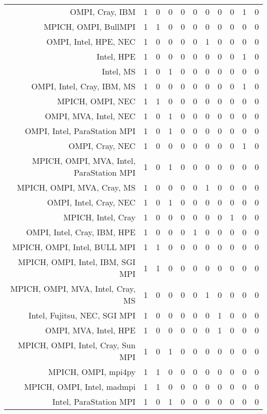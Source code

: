 {\begin{landscape}
\begin{longtable}[htb]{r|c|c|c|c|c|c|c|c|c|c}
{OMPI, Cray, IBM} & 1 & 0 & 0 & 0 & 0 & 0 & 0 & 0 & 1 & 0 \\%
{MPICH, OMPI, BullMPI} & 1 & 1 & 0 & 0 & 0 & 0 & 0 & 0 & 0 & 0 \\%
{OMPI, Intel, HPE, NEC} & 1 & 0 & 0 & 0 & 0 & 1 & 0 & 0 & 0 & 0 \\%
{Intel, HPE} & 1 & 0 & 0 & 0 & 0 & 0 & 0 & 0 & 1 & 0 \\%
{Intel, MS} & 1 & 0 & 1 & 0 & 0 & 0 & 0 & 0 & 0 & 0 \\%
{OMPI, Intel, Cray, IBM, MS} & 1 & 0 & 0 & 0 & 0 & 0 & 0 & 0 & 1 & 0 \\%
{MPICH, OMPI, NEC} & 1 & 1 & 0 & 0 & 0 & 0 & 0 & 0 & 0 & 0 \\%
{OMPI, MVA, Intel, NEC} & 1 & 0 & 1 & 0 & 0 & 0 & 0 & 0 & 0 & 0 \\%
{OMPI, Intel, ParaStation MPI} & 1 & 0 & 1 & 0 & 0 & 0 & 0 & 0 & 0 & 0 \\%
{OMPI, Cray, NEC} & 1 & 0 & 0 & 0 & 0 & 0 & 0 & 0 & 1 & 0 \\%
{MPICH, OMPI, MVA, Intel, ParaStation MPI} & 1 & 0 & 1 & 0 & 0 & 0 & 0 & 0 & 0 & 0 \\%
{MPICH, OMPI, MVA, Cray, MS} & 1 & 0 & 0 & 0 & 0 & 1 & 0 & 0 & 0 & 0 \\%
{OMPI, Intel, Cray, NEC} & 1 & 0 & 1 & 0 & 0 & 0 & 0 & 0 & 0 & 0 \\%
{MPICH, Intel, Cray} & 1 & 0 & 0 & 0 & 0 & 0 & 0 & 1 & 0 & 0 \\%
{OMPI, Intel, Cray, IBM, HPE} & 1 & 0 & 0 & 0 & 1 & 0 & 0 & 0 & 0 & 0 \\%
{MPICH, OMPI, Intel, BULL MPI} & 1 & 1 & 0 & 0 & 0 & 0 & 0 & 0 & 0 & 0 \\%
{MPICH, OMPI, Intel, IBM, SGI MPI} & 1 & 1 & 0 & 0 & 0 & 0 & 0 & 0 & 0 & 0 \\%
{MPICH, OMPI, MVA, Intel, Cray, MS} & 1 & 0 & 0 & 0 & 0 & 1 & 0 & 0 & 0 & 0 \\%
{Intel, Fujitsu, NEC, SGI MPI} & 1 & 0 & 0 & 0 & 0 & 0 & 1 & 0 & 0 & 0 \\%
{OMPI, MVA, Intel, HPE} & 1 & 0 & 0 & 0 & 0 & 0 & 1 & 0 & 0 & 0 \\%
{MPICH, OMPI, Intel, Cray, Sun MPI} & 1 & 0 & 1 & 0 & 0 & 0 & 0 & 0 & 0 & 0 \\%
{MPICH, OMPI, mpi4py} & 1 & 1 & 0 & 0 & 0 & 0 & 0 & 0 & 0 & 0 \\%
{MPICH, OMPI, Intel, madmpi} & 1 & 1 & 0 & 0 & 0 & 0 & 0 & 0 & 0 & 0 \\%
{Intel, ParaStation MPI} & 1 & 0 & 1 & 0 & 0 & 0 & 0 & 0 & 0 & 0 \\%

\end{longtable}
\end{landscape}}
